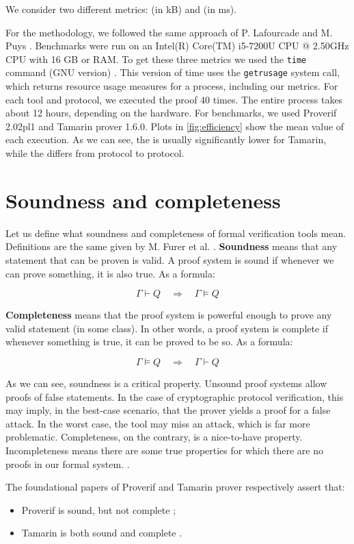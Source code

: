 We consider two different metrics: \textit{\mrss{}} (in kB) and \textit{\wct{}} (in ms).

For the methodology, we followed the same approach of P. Lafourcade and M. Puys \cite{lafourcade:hal-01306395}. Benchmarks were run on an Intel(R) Core(TM) i5-7200U CPU @ 2.50GHz CPU with 16 GB or RAM. To get these three metrics we used the \lstinline{time} command (GNU version) \cite{time_command}. This version of time uses the \lstinline{getrusage} system call, which returns resource usage measures for a process, including our metrics. For each tool and protocol, we executed the proof 40 times. The entire process takes about 12 hours, depending on the hardware. For benchmarks, we used Proverif 2.02pl1 and Tamarin prover 1.6.0. Plots in \cref{fig:efficiency} show the mean value of each execution. As we can see, the \mrss{} is usually significantly lower for Tamarin, while the \wct{} differs from protocol to protocol.


\section{Soundness and completeness}
Let us define what soundness and completeness of formal verification tools mean. Definitions are the same given by M. Furer et al. \cite{furer1989completeness}.
\textbf{Soundness} means that any statement that can be proven is valid. A proof system is sound if whenever we can prove something, it is also true. As a formula:

\begin{equation}
    \Gamma \vdash Q \quad \Longrightarrow \quad \Gamma \models Q
\end{equation}

\textbf{Completeness} means that the proof system is powerful enough to prove any valid statement (in some class). In other words, a proof system is complete if whenever something is true, it can be proved to be so. As a formula:

\begin{equation}
    \Gamma \models Q \quad \Longrightarrow \quad \Gamma \vdash Q
\end{equation}

As we can see, soundness is a critical property. Unsound proof systems allow proofs of false statements. In the case of cryptographic protocol verification, this may imply, in the best-case scenario, that the prover yields a proof for a false attack. In the worst case, the tool may miss an attack, which is far more problematic.
Completeness, on the contrary, is a nice-to-have property. Incompleteness means there are some true properties for which there are no proofs in our formal system. \cite{slides_on_sound_complete}.

The foundational papers of Proverif and Tamarin prover respectively assert that:
\begin{itemize}
    \item Proverif is sound, but not complete \cite{ProverifManual};
    \item Tamarin is both sound and complete \cite{TamarinFoundations, TamarinFoundationsExtended, xor_tamarin}.
\end{itemize}

